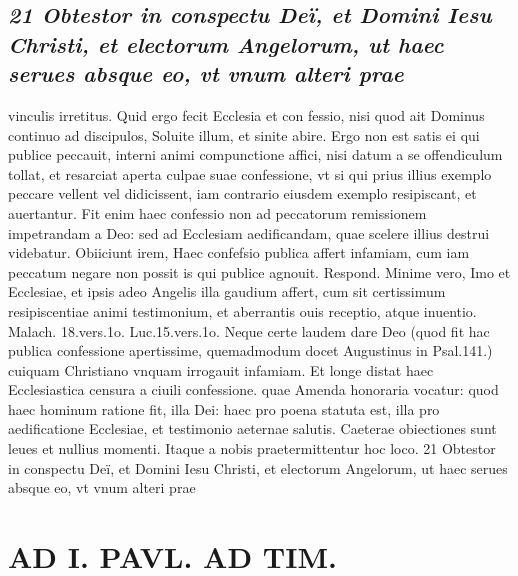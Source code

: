 \documentclass{article}
\begin{document}
\begin{pages}
\subsection*{\textit{21 Obtestor in conspectu Deï, et Domini Iesu Christi, et electorum Angelorum, ut haec serues absque eo, vt vnum alteri prae}}vinculis irretitus. Quid ergo fecit Ecclesia et con fessio, nisi quod ait Dominus continuo ad discipulos, Soluite illum, et sinite abire. Ergo non est satis ei qui publice peccauit, interni animi compunctione affici, nisi datum a se offendiculum tollat, et resarciat aperta culpae suae confessione, vt si qui prius illius exemplo peccare vellent vel didicissent, iam contrario eiusdem exemplo resipiscant, et auertantur. Fit enim haec confessio non ad peccatorum remissionem impetrandam a Deo: sed ad Ecclesiam aedificandam, quae scelere illius destrui videbatur. Obiiciunt irem, Haec confefsio publica affert infamiam, cum iam peccatum negare non possit is qui publice agnouit. Respond. Minime vero, Imo et Ecclesiae, et ipsis adeo Angelis illa gaudium affert, cum sit certissimum resipiscentiae animi testimonium, et aberrantis ouis receptio, atque inuentio. Malach. 18.vers.1o. Luc.15.vers.1o. Neque certe laudem dare Deo (quod fit hac publica confessione apertissime, quemadmodum docet Augustinus in Psal.141.) cuiquam Christiano vnquam irrogauit infamiam. Et longe distat haec Ecclesiastica censura a ciuili confessione. quae Amenda honoraria vocatur: quod haec hominum ratione fit, illa Dei: haec pro poena statuta est, illa pro aedificatione Ecclesiae, et testimonio aeternae salutis. Caeterae obiectiones sunt leues et nullius momenti. Itaque a nobis praetermittentur hoc loco. 21 Obtestor in conspectu Deï, et Domini Iesu Christi, et electorum Angelorum, ut haec serues absque eo, vt vnum alteri prae\pend
\section*{AD I. PAVL. AD TIM. }
\marginpar{[ p.628 ]}\pstart {}
{}

\end{pages}
\end{document}
